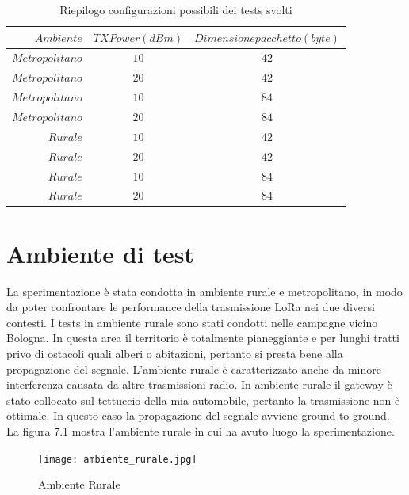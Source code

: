 \documentclass[12pt,a4paper,openright,twoside]{report}
\begin{document}
\begin{table}[h]                        
\begin{center}                          
\begin{tabular}{r|c|c}                  
                                                   
$Ambiente$ & $TX Power (dBm)$ & $Dimensione pacchetto (byte)$\\         
\hline\hline                                  
$Metropolitano$ & $10$ & $42$\\     
\hline                               
$Metropolitano$ & $20$ & $42$\\
\hline        
$Metropolitano$ & $10$ & $84$\\ 
\hline 
$Metropolitano$ & $20$ & $84$\\ 
\hline 
$Rurale$ & $10$ & $42$\\     
\hline                               
$Rurale$ & $20$ & $42$\\
\hline        
$Rurale$ & $10$ & $84$\\ 
\hline 
$Rurale$ & $20$ & $84$\\ 
\hline \hline                         
\end{tabular}
\caption[Riepilogo configurazioni possibili dei tests svolti]{Riepilogo configurazioni possibili dei tests svolti}\label{tab:uno}
\end{center}
\end{table}

\section{Ambiente di test}
La sperimentazione \`e stata condotta in ambiente rurale e metropolitano, in modo da poter confrontare le performance della trasmissione LoRa nei due diversi contesti. 
I tests in ambiente rurale sono stati condotti nelle campagne vicino Bologna. In questa area il territorio \`e totalmente pianeggiante e per lunghi tratti privo di ostacoli quali alberi o abitazioni, pertanto si presta bene alla propagazione del segnale. L'ambiente rurale \`e caratterizzato anche da minore interferenza causata da altre trasmissioni radio. In ambiente rurale il gateway \`e stato collocato sul tettuccio della mia automobile, pertanto la trasmissione non \`e ottimale. In questo caso la propagazione del segnale avviene ground to ground. 
La figura 7.1 mostra l'ambiente rurale in cui ha avuto luogo la sperimentazione.
\begin{figure}[h]                      
\begin{center} 
\texttt{[image: ambiente\_rurale.jpg]}
\caption[Ambiente Rurale]{Ambiente Rurale}\label{fig:prima}
\end{center}
\end{figure}
\end{document}
